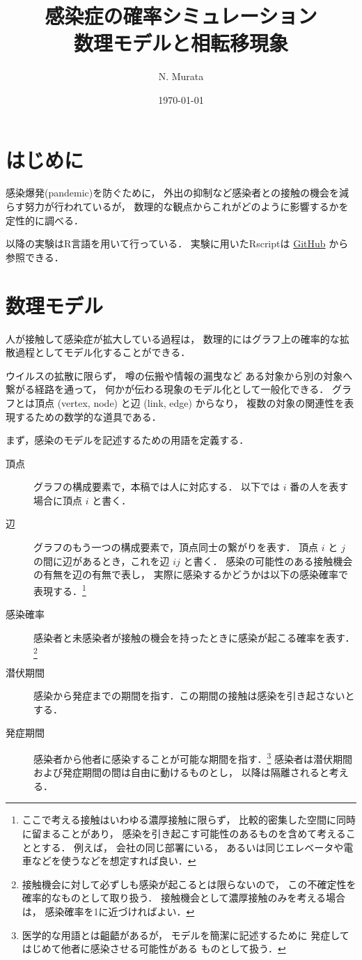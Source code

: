 \documentclass[10pt,oneside]{scrartcl}
\author{N. Murata}
\date{\today}
\title{感染症の確率シミュレーション\\\medskip
\large 数理モデルと相転移現象}
\begin{document}
\maketitle

\section{はじめに}
\label{sec:org6cc3666}

感染爆発(pandemic)を防ぐために，
外出の抑制など感染者との接触の機会を減らす努力が行われているが，
数理的な観点からこれがどのように影響するかを定性的に調べる．

以降の実験はR言語を用いて行っている．
実験に用いたRscriptは
\href{https://github.com/noboru-murata/epidemic-model}{GitHub}
から参照できる．

\section{数理モデル}
\label{sec:org0fd8ca0}
人が接触して感染症が拡大している過程は，
数理的にはグラフ上の確率的な拡散過程としてモデル化することができる．

ウイルスの拡散に限らず，
噂の伝搬や情報の漏曳など
ある対象から別の対象へ繋がる経路を通って，
何かが伝わる現象のモデル化として一般化できる．
グラフとは頂点 (vertex, node) と辺 (link, edge) からなり，
複数の対象の関連性を表現するための数学的な道具である．

まず，感染のモデルを記述するための用語を定義する．
\begin{description}
\item[{頂点}] グラフの構成要素で，本稿では人に対応する．
以下では \(i\) 番の人を表す場合に頂点 \(i\) と書く．
\item[{辺}] グラフのもう一つの構成要素で，頂点同士の繋がりを表す．
頂点 \(i\) と \(j\) の間に辺があるとき，これを辺 \(ij\) と書く．
感染の可能性のある接触機会の有無を辺の有無で表し，
実際に感染するかどうかは以下の感染確率で表現する．\footnote{ここで考える接触はいわゆる濃厚接触に限らず，
比較的密集した空間に同時に留まることがあり，
感染を引き起こす可能性のあるものを含めて考えることとする．
例えば，
会社の同じ部署にいる，
あるいは同じエレベータや電車などを使うなどを想定すれば良い．}
\item[{感染確率}] 感染者と未感染者が接触の機会を持ったときに感染が起こる確率を表す．\footnote{接触機会に対して必ずしも感染が起こるとは限らないので，
この不確定性を確率的なものとして取り扱う．
接触機会として濃厚接触のみを考える場合は，
感染確率を1に近づければよい．}
\item[{潜伏期間}] 感染から発症までの期間を指す．この期間の接触は感染を引き起さないとする．
\item[{発症期間}] 感染者から他者に感染することが可能な期間を指す．\footnote{医学的な用語とは齟齬があるが，
モデルを簡潔に記述するために
発症してはじめて他者に感染させる可能性がある
ものとして扱う．}
感染者は潜伏期間および発症期間の間は自由に動けるものとし，
以降は隔離されると考える．
\end{description}
\end{document}
